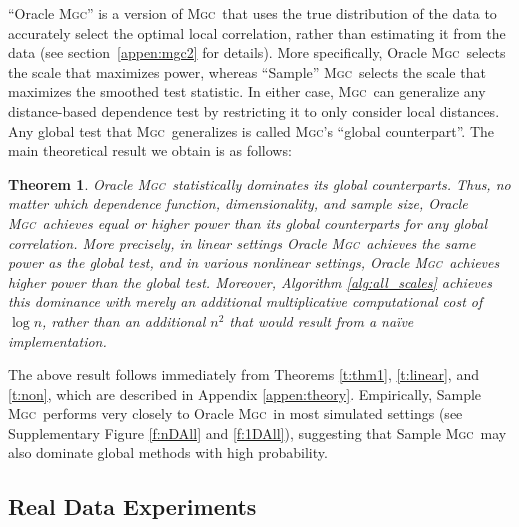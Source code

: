 \documentclass[11pt]{article}
\providecommand{\sct}[1]{{\normalfont\textsc{#1}}}
\newcommand{\Mgc}{\sct{Mgc}}
\newtheorem{thm}{Theorem}
\begin{document}
``Oracle \Mgc'' is a version of \Mgc~that uses the true distribution of the data to accurately select the optimal local correlation, rather than estimating it from the data (see section~\ref{appen:mgc2} for details). More specifically, Oracle \Mgc~selects the scale that maximizes power, whereas ``Sample'' \Mgc~selects the scale that maximizes the smoothed test statistic. 
In either case,  \Mgc~can generalize any distance-based dependence test by restricting it to only consider local distances.  Any global test that \Mgc~generalizes is called \Mgc's ``global counterpart''.  The main theoretical result we obtain is as follows:
% 
\begin{thm} \label{t:dominate}
Oracle \Mgc~statistically dominates its global counterparts. Thus, no matter which 
dependence function, dimensionality, and sample size, 
Oracle \Mgc~achieves equal or higher power than its global counterparts for any global correlation.  More precisely, in \emph{linear} settings Oracle \Mgc~achieves the same power as the global test, and in various nonlinear settings, Oracle \Mgc~achieves {higher} power than the global test. Moreover, Algorithm \ref{alg:all_scales} achieves this dominance with merely an additional multiplicative computational cost of $\log n$, rather than an additional $n^2$ that would result from a na\"ive implementation.
\end{thm}

The above result follows immediately from Theorems \ref{t:thm1}, \ref{t:linear}, and \ref{t:non}, which are described in Appendix \ref{appen:theory}.   Empirically, Sample \Mgc~performs very closely to Oracle \Mgc~in most simulated settings (see Supplementary Figure \ref{f:nDAll} and \ref{f:1DAll}), suggesting that Sample \Mgc~may also dominate global methods with high probability.

\subsection*{Real Data Experiments}
\label{numer3}
\end{document}
